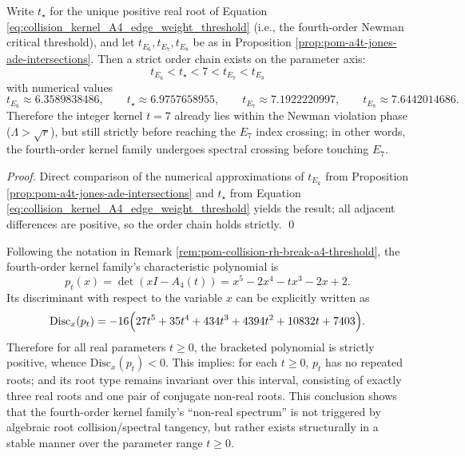 \begin{corollary}\label{cor:pom-a4t-newman-threshold-ade-ordering}
Write \(t_\star\) for the unique positive real root of Equation \eqref{eq:collision_kernel_A4_edge_weight_threshold} (i.e., the fourth-order Newman critical threshold), and let \(t_{E_6},t_{E_7},t_{E_8}\) be as in Proposition \ref{prop:pom-a4t-jones-ade-intersections}.
Then a strict order chain exists on the parameter axis:
\[
\boxed{\;t_{E_6}<t_\star<7<t_{E_7}<t_{E_8}\;}
\]
with numerical values
\[
t_{E_6}\approx 6.3589838486,\qquad
t_\star\approx 6.9757658955,\qquad
t_{E_7}\approx 7.1922220997,\qquad
t_{E_8}\approx 7.6442014686.
\]
Therefore the integer kernel \(t=7\) already lies within the Newman violation phase (\(\Lambda>\sqrt r\)), but still strictly before reaching the \(E_7\) index crossing; in other words, the fourth-order kernel family undergoes spectral crossing before touching \(E_7\).
\end{corollary}
\begin{proof}
Direct comparison of the numerical approximations of \(t_{E_k}\) from Proposition \ref{prop:pom-a4t-jones-ade-intersections} and \(t_\star\) from Equation \eqref{eq:collision_kernel_A4_edge_weight_threshold} yields the result; all adjacent differences are positive, so the order chain holds strictly. \qed
\end{proof}



\begin{remark}\label{rem:pom-a4t-discriminant-root-type}
Following the notation in Remark \ref{rem:pom-collision-rh-break-a4-threshold}, the fourth-order kernel family's characteristic polynomial is
\[
p_t(x)=\det(xI-A_4(t))=x^5-2x^4-tx^3-2x+2.
\]
Its discriminant with respect to the variable \(x\) can be explicitly written as
\[
\mathrm{Disc}_x(p_t)
=-16\Bigl(27t^5+35t^4+434t^3+4394t^2+10832t+7403\Bigr).
\]
Therefore for all real parameters \(t\ge 0\), the bracketed polynomial is strictly positive, whence \(\mathrm{Disc}_x(p_t)<0\).
This implies: for each \(t\ge 0\), \(p_t\) has no repeated roots; and its root type remains invariant over this interval, consisting of exactly three real roots and one pair of conjugate non-real roots.
This conclusion shows that the fourth-order kernel family's ``non-real spectrum'' is not triggered by algebraic root collision/spectral tangency, but rather exists structurally in a stable manner over the parameter range \(t\ge 0\).
\end{remark}

